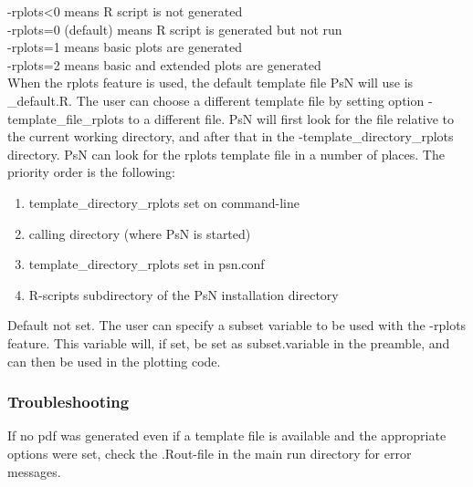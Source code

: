 \begin{optionlist}
-rplots<0 means R script is not generated\\ 
-rplots=0 (default) means R script is generated but not run\\ 
-rplots=1 means basic plots are generated\\													  
-rplots=2 means basic and extended plots are generated\\													  
\nextopt
{}
When the rplots feature is used, the default template file PsN will use is 
\guidetoolname\_default.R. 
The user can choose a different template file
by setting option -template\_file\_rplots to a different file. 
PsN will first look for the file relative to the current working directory, 
and after that in the -template\_directory\_rplots directory.
\nextopt
{}
PsN can look for the rplots template file in a number of places. The priority order is the
following:
\begin{enumerate}
\item template\_directory\_rplots set on command-line 
\item calling directory (where PsN is started)
\item template\_directory\_rplots set in psn.conf 
\item R-scripts subdirectory of the PsN installation directory
\end{enumerate}
\nextopt
{}
Default not set. The user can specify a subset variable to be used with the -rplots feature. 
This variable
will, if set, be set as subset.variable in the preamble,
and can then be used in the plotting code. 
\nextopt
\end{optionlist}

\subsubsection*{Troubleshooting}
If no pdf was generated even if a template file is available and the appropriate options
were set, check the .Rout-file in the main run directory for error messages.
